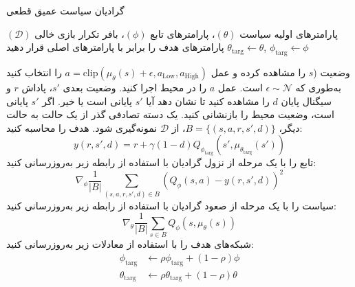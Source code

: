         
%        
        
        
        \begin{algorithm}[H]
        	\caption{گرادیان سیاست عمیق قطعی}\label{alg:DDPG}
        	\begin{algorithmic}[1]
   پارامترهای اولیه سیاست
$(\theta)$، پارامترهای تابع
$(\phi)$، بافر تکرار بازی خالی $(\mathcal{D})$
\State پارامترهای هدف را برابر با پارامترهای اصلی قرار دهید
$\theta_{\text{targ}} \leftarrow \theta$, $\phi_{\text{targ}} \leftarrow \phi$

\State 
وضعیت 
(\(s\)
 را مشاهده کرده و عمل $a = \text{clip}(\mu_{\theta}(s) + \epsilon, a_{\text{Low}}, a_{\text{High}})$ را انتخاب کنید به‌طوری که $\epsilon \sim \mathcal{N}$ است.
\State عمل $a$ را در محیط اجرا کنید.
\State وضعیت بعدی $s'$، پاداش $r$ و سیگنال پایان $d$ را مشاهده کنید تا نشان دهد آیا $s'$ پایانی است یا خیر.
\State اگر $s'$ پایانی است، وضعیت محیط را بازنشانی کنید.
\State یک دسته تصادفی گذر از ‌یک حالت به حالت دیگر، $B = \{ (s,a,r,s',d) \}$، از $\mathcal{D}$ نمونه‌گیری شود.
\State
هدف را محاسبه کنید:
\[ y(r,s',d) = r + \gamma (1-d) Q_{\phi_{\text{targ}}}(s', \mu_{\theta_{\text{targ}}}(s')) \]
\State تابع  را با یک مرحله از نزول گرادیان با استفاده از رابطه زیر به‌روزرسانی کنید:
\[ \nabla_{\phi} \frac{1}{|B|}\sum_{(s,a,r,s',d) \in B} \left( Q_{\phi}(s,a) - y(r,s',d) \right)^2 \]
\State سیاست را با یک مرحله از صعود گرادیان با استفاده از رابطه زیر به‌روزرسانی کنید:
\[ \nabla_{\theta} \frac{1}{|B|}\sum_{s \in B}Q_{\phi}(s, \mu_{\theta}(s)) \]
\State شبکه‌های هدف را با استفاده از معادلات زیر به‌روزرسانی کنید:
\begin{align*}
	\phi_{\text{targ}} &\leftarrow \rho \phi_{\text{targ}} + (1-\rho) \phi \\
	\theta_{\text{targ}} &\leftarrow \rho \theta_{\text{targ}} + (1-\rho) \theta
\end{align*}
\EndFor
\EndIf
\EndWhile
        	\end{algorithmic}
        \end{algorithm}
        
     



